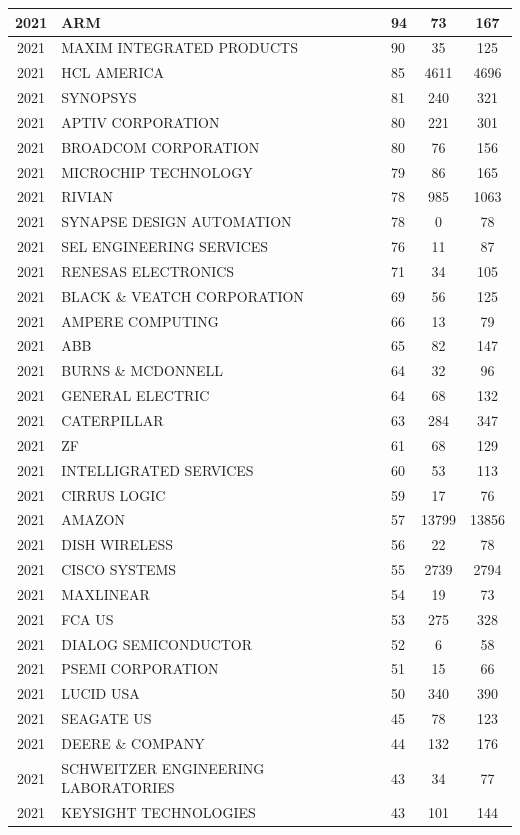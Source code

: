 \documentclass{article}%
\begin{document}
\begin{longtable}{c|p{20em}|p{5em}|c|c}
2021&ARM&94&73&167\\%
\hline%
2021&MAXIM INTEGRATED PRODUCTS&90&35&125\\%
\hline%
2021&HCL AMERICA&85&4611&4696\\%
\hline%
2021&SYNOPSYS&81&240&321\\%
\hline%
2021&APTIV CORPORATION&80&221&301\\%
\hline%
2021&BROADCOM CORPORATION&80&76&156\\%
\hline%
2021&MICROCHIP TECHNOLOGY&79&86&165\\%
\hline%
2021&RIVIAN&78&985&1063\\%
\hline%
2021&SYNAPSE DESIGN AUTOMATION&78&0&78\\%
\hline%
2021&SEL ENGINEERING SERVICES&76&11&87\\%
\hline%
2021&RENESAS ELECTRONICS&71&34&105\\%
\hline%
2021&BLACK \& VEATCH CORPORATION&69&56&125\\%
\hline%
2021&AMPERE COMPUTING&66&13&79\\%
\hline%
2021&ABB&65&82&147\\%
\hline%
2021&BURNS \& MCDONNELL&64&32&96\\%
\hline%
2021&GENERAL ELECTRIC&64&68&132\\%
\hline%
2021&CATERPILLAR&63&284&347\\%
\hline%
2021&ZF&61&68&129\\%
\hline%
2021&INTELLIGRATED SERVICES&60&53&113\\%
\hline%
2021&CIRRUS LOGIC&59&17&76\\%
\hline%
2021&AMAZON&57&13799&13856\\%
\hline%
2021&DISH WIRELESS&56&22&78\\%
\hline%
2021&CISCO SYSTEMS&55&2739&2794\\%
\hline%
2021&MAXLINEAR&54&19&73\\%
\hline%
2021&FCA US&53&275&328\\%
\hline%
2021&DIALOG SEMICONDUCTOR&52&6&58\\%
\hline%
2021&PSEMI CORPORATION&51&15&66\\%
\hline%
2021&LUCID USA&50&340&390\\%
\hline%
2021&SEAGATE US&45&78&123\\%
\hline%
2021&DEERE \& COMPANY&44&132&176\\%
\hline%
2021&SCHWEITZER ENGINEERING LABORATORIES&43&34&77\\%
\hline%
2021&KEYSIGHT TECHNOLOGIES&43&101&144\\%

\end{longtable}
\end{document}
